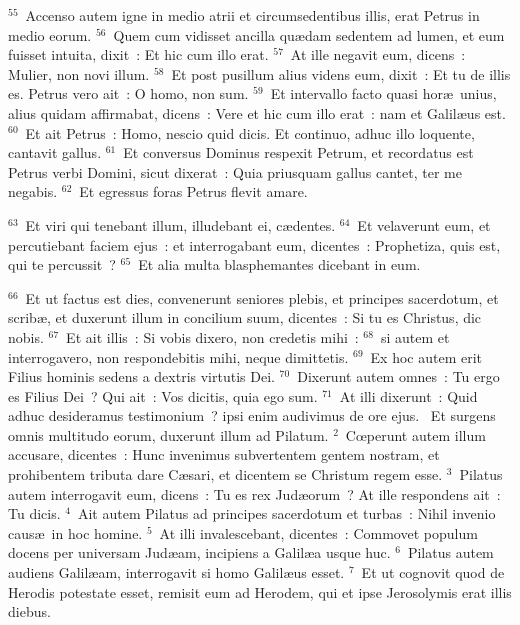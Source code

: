 ${}^{55}$~Accenso autem igne in medio atrii et circumsedentibus illis, erat Petrus in medio eorum.
${}^{56}$~Quem cum vidisset ancilla qu\ae dam sedentem ad lumen, et eum fuisset intuita, dixit~: Et hic cum illo erat.
${}^{57}$~At ille negavit eum, dicens~: Mulier, non novi illum.
${}^{58}$~Et post pusillum alius videns eum, dixit~: Et tu de illis es. Petrus vero ait~: O homo, non sum.
${}^{59}$~Et intervallo facto quasi hor\ae\ unius, alius quidam affirmabat, dicens~: Vere et hic cum illo erat~: nam et Galil\ae us est.
${}^{60}$~Et ait Petrus~: Homo, nescio quid dicis. Et continuo, adhuc illo loquente, cantavit gallus.
${}^{61}$~Et conversus Dominus respexit Petrum, et recordatus est Petrus verbi Domini, sicut dixerat~: Quia priusquam gallus cantet, ter me negabis.
${}^{62}$~Et egressus foras Petrus flevit amare.


${}^{63}$~Et viri qui tenebant illum, illudebant ei, c\ae dentes.
${}^{64}$~Et velaverunt eum, et percutiebant faciem ejus~: et interrogabant eum, dicentes~: Prophetiza, quis est, qui te percussit~?
${}^{65}$~Et alia multa blasphemantes dicebant in eum.


${}^{66}$~Et ut factus est dies, convenerunt seniores plebis, et principes sacerdotum, et scrib\ae , et duxerunt illum in concilium suum, dicentes~: Si tu es Christus, dic nobis.
${}^{67}$~Et ait illis~: Si vobis dixero, non credetis mihi~:
${}^{68}$~si autem et interrogavero, non respondebitis mihi, neque dimittetis.
${}^{69}$~Ex hoc autem erit Filius hominis sedens a dextris virtutis Dei.
${}^{70}$~Dixerunt autem omnes~: Tu ergo es Filius Dei~? Qui ait~: Vos dicitis, quia ego sum.
${}^{71}$~At illi dixerunt~: Quid adhuc desideramus testimonium~? ipsi enim audivimus de ore ejus.
~Et surgens omnis multitudo eorum, duxerunt illum ad Pilatum.
${}^{2}$~Cœperunt autem illum accusare, dicentes~: Hunc invenimus subvertentem gentem nostram, et prohibentem tributa dare C\ae sari, et dicentem se Christum regem esse.
${}^{3}$~Pilatus autem interrogavit eum, dicens~: Tu es rex Jud\ae orum~? At ille respondens ait~: Tu dicis.
${}^{4}$~Ait autem Pilatus ad principes sacerdotum et turbas~: Nihil invenio caus\ae\ in hoc homine.
${}^{5}$~At illi invalescebant, dicentes~: Commovet populum docens per universam Jud\ae am, incipiens a Galil\ae a usque huc.
${}^{6}$~Pilatus autem audiens Galil\ae am, interrogavit si homo Galil\ae us esset.
${}^{7}$~Et ut cognovit quod de Herodis potestate esset, remisit eum ad Herodem, qui et ipse Jerosolymis erat illis diebus.


